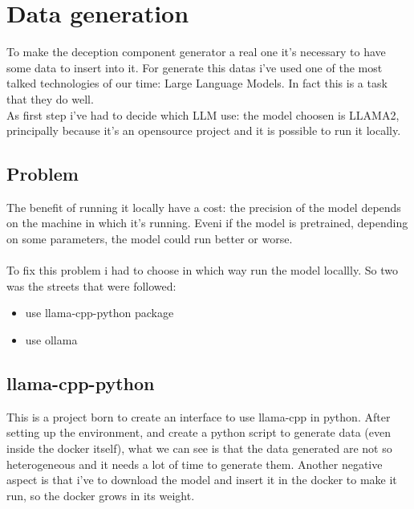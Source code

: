 \chapter{Data generation}
To make the deception component generator a real one it's necessary to have some data to insert into it.
For generate this datas i've used one of the most talked technologies of our time: Large Language Models. In fact this is a task that they do well.
\\
As first step i've had to decide which LLM use: the model choosen is LLAMA2, principally because it's an opensource project and it is possible to run it locally.
\section{Problem}
The benefit of running it locally have a cost: the precision of the model depends on the machine in which it's running. Eveni if the model is pretrained, depending on some parameters, the model could run better or worse.
\\\\
To fix this problem i had to choose in which way run the model locallly. So two was the streets that were followed:
\begin{itemize}
    \item use llama-cpp-python package
    \item use ollama
\end{itemize}
\section{llama-cpp-python}
This is a project born to create an interface to use llama-cpp in python.
After setting up the environment, and create a python script to generate data (even inside the docker itself), what we can see is that the data generated are not so heterogeneous and it needs a lot of time to generate them.
Another negative aspect is that i've to download the model and insert it in the docker to make it run, so the docker grows in its weight.
